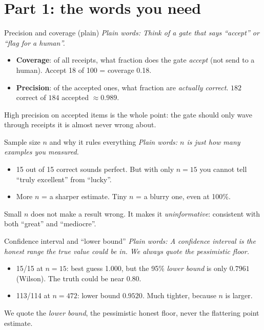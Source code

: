 \documentclass[aspectratio=169]{beamer}
\newcommand{\poolIntA}{184}
\newcommand{\poolIntC}{182}
\newcommand{\rgSroieWil}{0.7961}
\newcommand{\rgWrWil}{0.9520}
\newcommand{\keybox}[1]{\begin{center}\colorbox{grey!15}{\parbox{0.92\linewidth}{\centering #1}}\end{center}}
\newcommand{\plain}[1]{\textit{\textcolor{sig}{Plain words:} #1}}
\begin{document}
\section{Part 1: the words you need}
\begin{frame}{Precision and coverage (plain)}
\plain{Think of a gate that says ``accept'' or ``flag for a human''.}
\begin{itemize}
\item \textbf{Coverage}: of all receipts, what fraction does the gate
\emph{accept} (not send to a human). Accept 18 of 100 = coverage 0.18.
\item \textbf{Precision}: of the accepted ones, what fraction are
\emph{actually correct}. $\poolIntC$ correct of $\poolIntA$ accepted
$\approx 0.989$.
\end{itemize}
\keybox{High precision on accepted items is the whole point: the gate
should only wave through receipts it is almost never wrong about.}
\end{frame}

\begin{frame}{Sample size $n$ and why it rules everything}
\plain{$n$ is just how many examples you measured.}
\begin{itemize}
\item 15 out of 15 correct sounds perfect. But with only $n{=}15$ you
cannot tell ``truly excellent'' from ``lucky''.
\item More $n$ = a sharper estimate. Tiny $n$ = a blurry one, even at
100\%.
\end{itemize}
\keybox{Small $n$ does not make a result wrong. It makes it
\emph{uninformative}: consistent with both ``great'' and ``mediocre''.}
\end{frame}

\begin{frame}{Confidence interval and ``lower bound''}
\plain{A confidence interval is the honest range the true value could be
in. We always quote the pessimistic floor.}
\begin{itemize}
\item 15/15 at $n{=}15$: best guess 1.000, but the 95\% \emph{lower
bound} is only $\rgSroieWil$ (Wilson). The truth could be near 0.80.
\item 113/114 at $n{=}472$: lower bound $\rgWrWil$. Much tighter,
because $n$ is larger.
\end{itemize}
\keybox{We quote the \emph{lower bound}, the pessimistic honest floor,
never the flattering point estimate.}
\end{frame}
\end{document}
